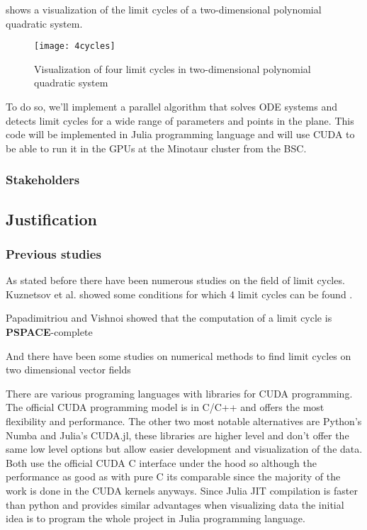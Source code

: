  shows a visualization of the limit cycles of a
two-dimensional polynomial quadratic system.

\begin{figure}[H]
    \centering
    \texttt{[image: 4cycles]}
    \caption{Visualization of four limit cycles in two-dimensional polynomial quadratic system
        \cite{kuznetsov_visualization_2013}
    }%
    \label{fig:kuznetsov}
\end{figure}

To do so, we'll implement a parallel algorithm that solves ODE systems and
detects limit cycles for a wide range of parameters and points in the plane.
This code will be implemented in Julia programming language and will use CUDA
to be able to run it in the GPUs at the Minotaur cluster from the BSC.

\subsubsection{Stakeholders}



\subsection{Justification}
\subsubsection{Previous studies}

As stated before there have been numerous studies on the field of limit cycles.
Kuznetsov et al. showed some conditions for which 4 limit cycles can be found
\cite{kuznetsov_visualization_2013}.

Papadimitriou and Vishnoi showed that the computation of a limit cycle is
\textbf{PSPACE}-complete \cite{papadimitriou_computational_2015}

And there have been some studies on numerical methods to find limit cycles on
two dimensional vector fields
\cite{leonov_hidden_2013,van_der_hoff_numerical_2013,casades_computation_2013,gasull_effective_nodate}

There are various programing languages with libraries for CUDA programming.
The official CUDA programming model is in C/C++ and offers the most flexibility
and performance. The other two most notable alternatives are Python's Numba
and Julia's CUDA.jl, these libraries are higher level and don't offer the same
low level options but allow easier development and visualization of the data.
Both use the official CUDA C interface under the hood so although the
performance as good as with pure C its comparable since the majority of the work
is done in the CUDA kernels anyways. Since Julia JIT compilation is faster than
python and provides similar advantages when visualizing data the initial idea is
to program the whole project in Julia programming language.

